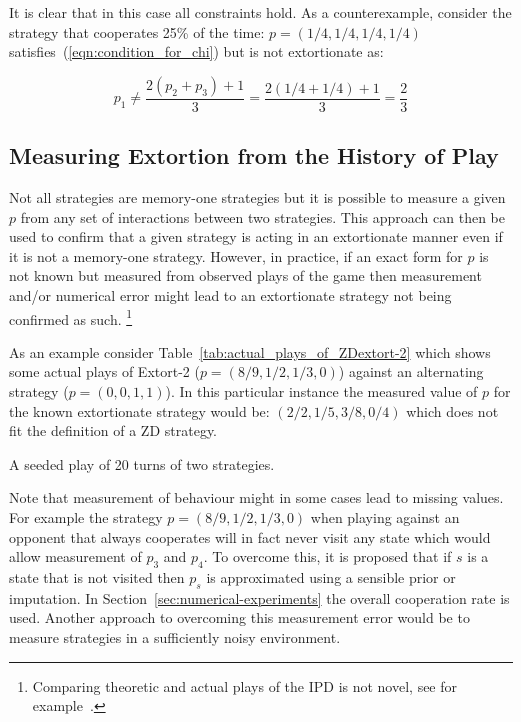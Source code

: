 \documentclass[a4paper]{article}
\begin{document}
It is clear that in this case all constraints hold. As a counterexample,
consider the strategy that cooperates 25\% of the time: \(p=(1 /4, 1 / 4, 1 / 4,
1 / 4)\) satisfies~(\ref{eqn:condition_for_chi}) but is not extortionate as:

\begin{equation}
    p_1 \ne \frac{2(p_2 + p_3) + 1}{3}
        = \frac{2(1 / 4 + 1 / 4) + 1}{3}
        = \frac{2}{3}
\end{equation}

\subsection{Measuring Extortion from the History of Play}

Not all strategies are memory-one strategies but it is possible to
measure a given \(p\) from any set of interactions between two strategies.
This approach can then be used to confirm that a given strategy is acting
in an extortionate manner even if it is not a memory-one strategy. However, in
practice, if an exact form for \(p\) is not known but measured from observed
plays of the game then measurement and/or numerical error might lead to an
extortionate strategy not being confirmed as such. \footnote{Comparing theoretic
and actual plays of the IPD is not novel, see for example~\cite{Rand2013}.}


As an example consider Table~\ref{tab:actual_plays_of_ZDextort-2} which shows
some actual plays of Extort-2 (\(p=(8 / 9, 1 / 2, 1 / 3, 0)\)) against an
alternating strategy (\(p=(0, 0, 1, 1)\)). In this particular instance the
measured value of \(p\) for the known extortionate strategy would be:
\((2/2, 1/5, 3/8, 0/4)\) which does not fit the definition of a ZD strategy.


\begin{table}[!hbtp]
    
    \caption{A seeded play of 20 turns of two strategies.}
    \label{tab:actual_plays_of_ZDextort-2}
\end{table}


Note that measurement of behaviour might in some cases lead to missing values.
For example the strategy \(p=(8 / 9, 1 / 2, 1 / 3, 0)\) when playing against an
opponent that always cooperates will in fact never visit any state which would allow measurement
of \(p_3\) and \(p_4\). To overcome this, it is proposed that if \(s\) is a state
that is not visited then \(p_s\) is approximated using a sensible prior or
imputation. In Section~\ref{sec:numerical-experiments} the overall cooperation
rate is used. Another approach to overcoming this measurement error would be to
measure strategies in a sufficiently noisy environment.
\end{document}
